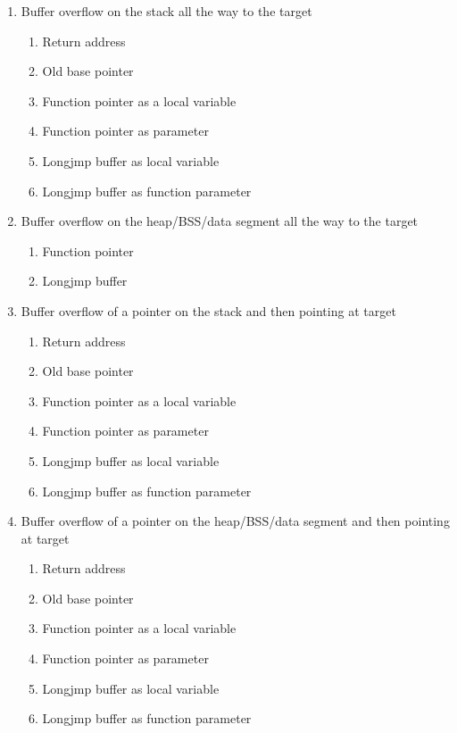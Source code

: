 \begin{enumerate}

\item Buffer overflow on the stack all the way to the target

  \begin{enumerate}
  \item Return address
  \item Old base pointer
  \item Function pointer as a local variable
  \item Function pointer as parameter
  \item Longjmp buffer as local variable
  \item Longjmp buffer as function parameter
  \end{enumerate}

\item Buffer overflow on the heap/BSS/data segment all the way to the target

  \begin{enumerate}
  \item Function pointer
  \item Longjmp buffer
  \end{enumerate}

\item Buffer overflow of a pointer on the stack and then pointing at target

  \begin{enumerate}
  \item Return address
  \item Old base pointer
  \item Function pointer as a local variable
  \item Function pointer as parameter
  \item Longjmp buffer as local variable
  \item Longjmp buffer as function parameter
  \end{enumerate}

\item Buffer overflow of a pointer on the heap/BSS/data segment and then pointing at target

  \begin{enumerate}
  \item Return address
  \item Old base pointer
  \item Function pointer as a local variable
  \item Function pointer as parameter
  \item Longjmp buffer as local variable
  \item Longjmp buffer as function parameter
  \end{enumerate}

\end{enumerate}

